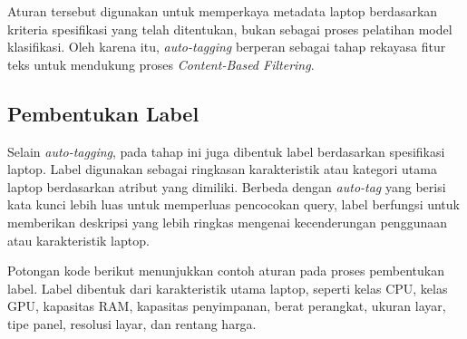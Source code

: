Aturan tersebut digunakan untuk memperkaya metadata laptop berdasarkan kriteria spesifikasi yang telah ditentukan, bukan sebagai proses pelatihan model klasifikasi. Oleh karena itu, \textit{auto-tagging} berperan sebagai tahap rekayasa fitur teks untuk mendukung proses \textit{Content-Based Filtering}.

\subsection{Pembentukan Label}
Selain \textit{auto-tagging}, pada tahap ini juga dibentuk label berdasarkan spesifikasi laptop. Label digunakan sebagai ringkasan karakteristik atau kategori utama laptop berdasarkan atribut yang dimiliki. Berbeda dengan \textit{auto-tag} yang berisi kata kunci lebih luas untuk memperluas pencocokan query, label berfungsi untuk memberikan deskripsi yang lebih ringkas mengenai kecenderungan penggunaan atau karakteristik laptop.

Potongan kode berikut menunjukkan contoh aturan pada proses pembentukan label. Label dibentuk dari karakteristik utama laptop, seperti kelas CPU, kelas GPU, kapasitas RAM, kapasitas penyimpanan, berat perangkat, ukuran layar, tipe panel, resolusi layar, dan rentang harga.

